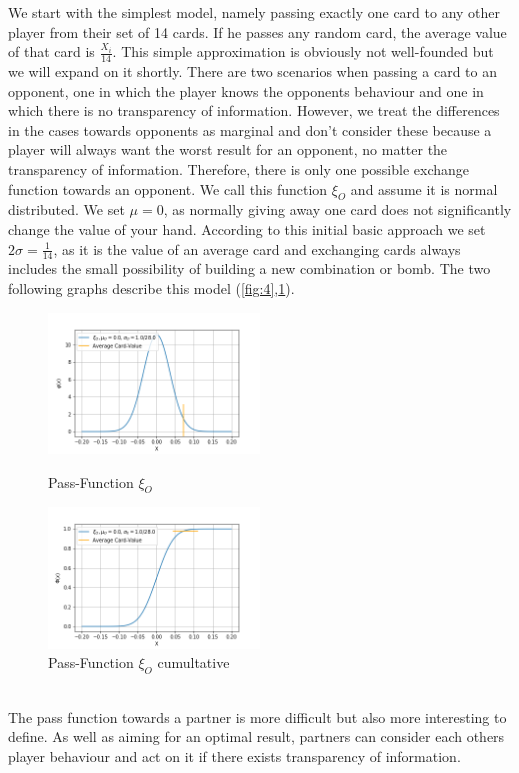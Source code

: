 We start with the simplest model, namely passing exactly one card to any other player from their set of 14 cards. If he passes any random card, the average value of that card is $\frac{X_i}{14}$. This simple approximation is obviously not well-founded but we will expand on it shortly. There are two scenarios when passing a card to an opponent, one in which the player knows the opponents behaviour and one in which there is no transparency of information. However, we treat the differences in the cases towards opponents as marginal and don’t consider these because a player will always want the worst result for an opponent, no matter the transparency of information. Therefore, there is only one possible exchange function towards an opponent. We call this function $\xi_O$ and assume it is normal distributed. We set $\mu = 0$, as normally giving away one card does not significantly change the value of your hand. According to this initial basic approach we set $2\sigma = \frac{1}{14}$, as it is the value of an average card and exchanging cards always includes the small possibility of building a new combination or bomb. The two following graphs describe this model (\ref{fig:4},\ref{fig:5}).
 \\
\begin{figure}[h]
    \centering
    \includegraphics[width=0.5\textwidth]{Bilder/b1_a}
    \caption{Pass-Function $\xi_O$}
    \label{fig:4}
    \centering
    \includegraphics[width=0.5\textwidth]{Bilder/b1_b}
    \caption{Pass-Function $\xi_O$ cumultative}
    \label{fig:5}
\end{figure}
\\
The pass function towards a partner is more difficult but also more interesting to define. As well as aiming for an optimal result, partners can consider each others player behaviour and act on it if there exists transparency of information.

